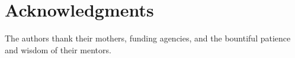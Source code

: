 \section{Acknowledgments}
The authors thank their mothers, funding agencies, and the bountiful patience and wisdom of their mentors.
